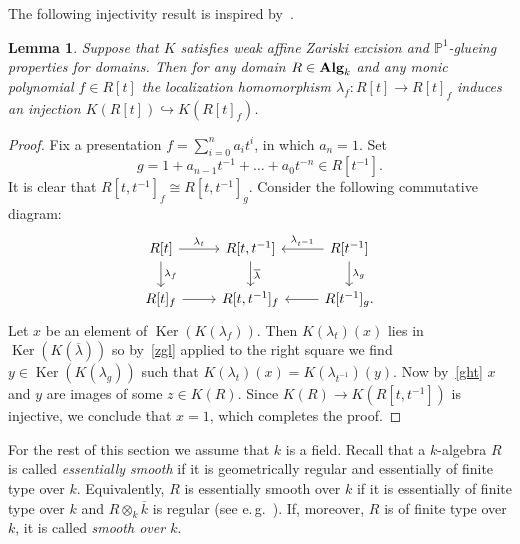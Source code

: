 \documentclass[oneside, 11pt]{amsart} \pdfoutput=1
\newcommand{\Ker}{\mathop{\mathrm{Ker}}\nolimits}
\numberwithin{equation}{section}
\newtheorem{lemma}{Lemma} \numberwithin{lemma}{section}
\theoremstyle{definition}
\newcommand{\catname}[1]{{\normalfont\textbf{#1}}} %
\begin{document}
The following injectivity result is inspired by~\cite[Corollary~5.2]{Tu83}.
\begin{lemma} \label{lmp}
Suppose that $K$ satisfies weak affine Zariski excision and $\mathbb{P}^1$-glueing properties for domains. Then for any domain $R\in \catname{Alg}_k$ and any monic polynomial $f\in R[t]$ the localization homomorphism $\lambda_f\colon R[t]\rightarrow R[t]_f$ induces an injection $K(R[t])\hookrightarrow K(R[t]_f).$ \end{lemma}
\begin{proof}
	Fix a presentation $f=\sum_{i=0}^n a_it^i$, in which $a_n=1$. Set $$g=1+a_{n-1}t^{-1}+\ldots+a_0t^{-n}\in R[t^{-1}].$$ It is clear that $R[t, t^{-1}]_f \cong R[t, t^{-1}]_g$. Consider the following commutative diagram:
$$\begin{tikzcd}
	R[t] \ar{r}{\lambda_t} \ar{d}{\lambda_f} & R[t, t^{-1}] \ar{d}{\overline{\lambda}} & R[t^{-1}] \ar{l}[']{\lambda_{t^{-1}}} \ar{d}{\lambda_g}\\
	R[t]_f \ar{r} & R[t, t^{-1}]_f & R[t^{-1}]_g. \ar{l}
\end{tikzcd}$$
Let $x$ be an element of $\Ker(K(\lambda_f))$. Then $K(\lambda_t)(x)$ lies in $\Ker(K(\overline{\lambda}))$ so by~\cref{zgl} applied to the right square we find $y \in \Ker(K(\lambda_{g}))$ such that $K(\lambda_t)(x) = K(\lambda_{t^{-1}})(y)$. Now by~\cref{ght} $x$ and $y$ are images of some $z \in K(R)$. Since $K(R) \to K(R[t, t^{-1}])$ is injective, we conclude that $x=1$, which completes the proof. \end{proof}

For the rest of this section we assume that $k$ is a field.
Recall that a $k$-algebra $R$ is called {\it essentially smooth} if it is geometrically regular and essentially of finite type over $k$. 
Equivalently, $R$ is essentially smooth over $k$ if it is essentially of finite type over $k$ and $R\otimes_k\overline k$ is regular (see e.\,g.~\cite[p.~137]{Sw98}). 
If, moreover, $R$ is of finite type over $k$, it is called {\it smooth over $k$}.
\end{document}

